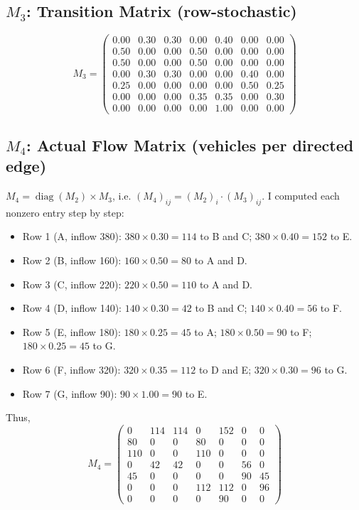 \documentclass{ximera}
\begin{document}
\subsection*{\texorpdfstring{\(M_3\)}{M3}: Transition Matrix (row-stochastic)}
\[
M_3 = \begin{pmatrix}
0.00 & 0.30 & 0.30 & 0.00 & 0.40 & 0.00 & 0.00\\
0.50 & 0.00 & 0.00 & 0.50 & 0.00 & 0.00 & 0.00\\
0.50 & 0.00 & 0.00 & 0.50 & 0.00 & 0.00 & 0.00\\
0.00 & 0.30 & 0.30 & 0.00 & 0.00 & 0.40 & 0.00\\
0.25 & 0.00 & 0.00 & 0.00 & 0.00 & 0.50 & 0.25\\
0.00 & 0.00 & 0.00 & 0.35 & 0.35 & 0.00 & 0.30\\
0.00 & 0.00 & 0.00 & 0.00 & 1.00 & 0.00 & 0.00
\end{pmatrix}
\]

\subsection*{\texorpdfstring{\(M_4\)}{M4}: Actual Flow Matrix (vehicles per directed edge)}
\(M_4 = \operatorname{diag}(M_2) \times M_3\), i.e. \((M_4)_{ij} = (M_2)_i \cdot (M_3)_{ij}\).  
I computed each nonzero entry step by step:

\begin{itemize}
    \item Row 1 (A, inflow 380): 
        \(380\times0.30 = 114\) to B and C; \(380\times0.40 = 152\) to E.
    \item Row 2 (B, inflow 160):
        \(160\times0.50 = 80\) to A and D.
    \item Row 3 (C, inflow 220):
        \(220\times0.50 = 110\) to A and D.
    \item Row 4 (D, inflow 140):
        \(140\times0.30 = 42\) to B and C; \(140\times0.40 = 56\) to F.
    \item Row 5 (E, inflow 180):
        \(180\times0.25 = 45\) to A; \(180\times0.50 = 90\) to F; \(180\times0.25 = 45\) to G.
    \item Row 6 (F, inflow 320):
        \(320\times0.35 = 112\) to D and E; \(320\times0.30 = 96\) to G.
    \item Row 7 (G, inflow 90):
        \(90\times1.00 = 90\) to E.
\end{itemize}
Thus,
\[
M_4 = \begin{pmatrix}
0   & 114 & 114 & 0   & 152 & 0   & 0\\
80  & 0   & 0   & 80  & 0   & 0   & 0\\
110 & 0   & 0   & 110 & 0   & 0   & 0\\
0   & 42  & 42  & 0   & 0   & 56  & 0\\
45  & 0   & 0   & 0   & 0   & 90  & 45\\
0   & 0   & 0   & 112 & 112 & 0   & 96\\
0   & 0   & 0   & 0   & 90  & 0   & 0
\end{pmatrix}
\]
\end{document}
